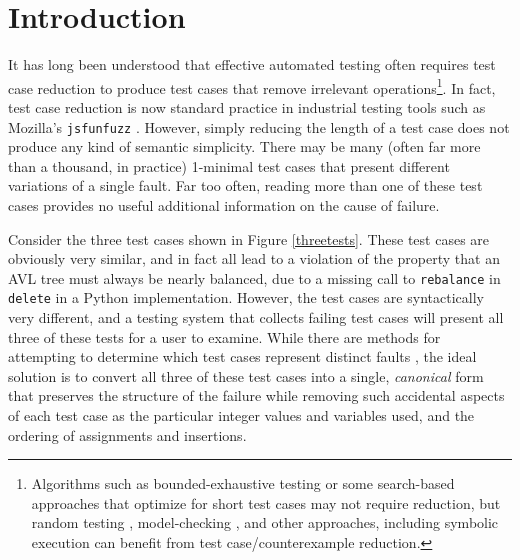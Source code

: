 \section{Introduction}

It has long been understood that effective automated testing often requires
test case reduction \cite{DD,MinUnit,TCminim,ICSEDiff} to produce test cases
that remove irrelevant operations\footnote{Algorithms such as
  bounded-exhaustive testing \cite{SoftBET} or some search-based approaches that
  optimize for short test cases \cite{FA11} may not require reduction, but random
  testing \cite{RandFormal,HamletOnly}, model-checking \cite{Gastin04minimizationof}, and other
  approaches, including symbolic execution \cite{issta14} can benefit from
  test case/counterexample reduction.}.  In fact, test case reduction is
now standard practice in industrial testing tools such as Mozilla's
{\tt jsfunfuzz} \cite{jsfunfuzz,jsfunfuzz2,lithium}.  However, simply reducing the length of a test case
does not produce any kind of semantic simplicity.  There may be many
(often far more than a thousand, in practice) 1-minimal test cases
that present different variations of a single fault.  Far too often,
reading more than one of these test cases provides no useful
additional information on the cause of failure. 

Consider the three test cases shown in Figure \ref{threetests}.  These
test cases are obviously very similar, and in fact all lead to a
violation of the property that an AVL tree must always be nearly
balanced, due to a missing call to {\tt rebalance} in {\tt delete} in
a Python implementation.  However, the test cases are
syntactically very different, and a testing system that collects
failing test cases will present all three of these tests for a user to examine.
While there are methods for attempting to determine which test cases
represent distinct faults \cite{PLDI13}, the ideal solution is
to convert all three of these test cases into a single,
\emph{canonical} form that preserves the structure of the failure while removing
such accidental aspects of each test case as the particular integer
values and variables used, and the ordering of assignments and
insertions.

